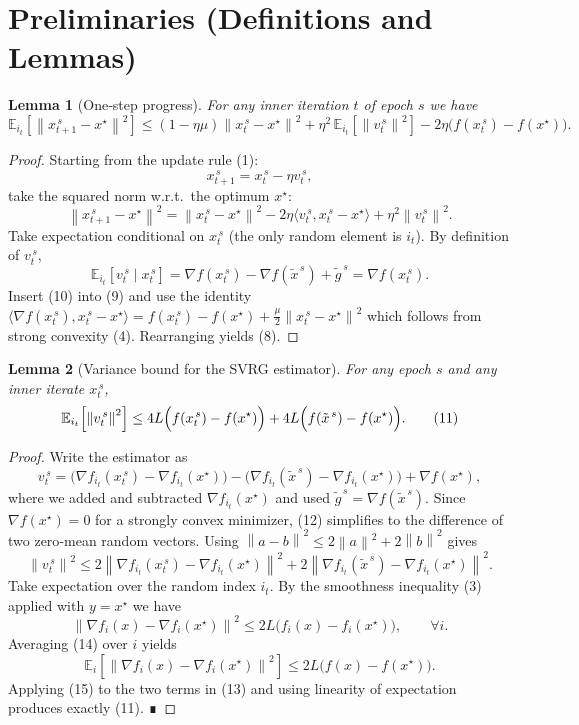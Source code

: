 \documentclass{article}
\newtheorem{lemma}{Lemma}
\newcommand{\E}{\mathbb{E}}
\newcommand{\norm}[1]{\left\|#1\right\|}
\newcommand{\inner}[2]{\langle #1,#2\rangle}
\newcommand{\grad}{\nabla}
\begin{document}
\newpage

\section*{Preliminaries (Definitions and Lemmas)}
\begin{lemma}[One‑step progress]\label{lem:one-step}
For any inner iteration \(t\) of epoch \(s\) we have
\[
\E_{i_t}\!\left[\norm{x_{t+1}^{\,s}-x^{\star}}^{2}\right]
\le\left(1-\eta\mu\right)\norm{x_{t}^{\,s}-x^{\star}}^{2}
+\eta^{2}\,\E_{i_t}\!\left[\norm{v_t^{\,s}}^{2}\right]
-2\eta\bigl(f(x_{t}^{\,s})-f(x^{\star})\bigr).
\tag{8}
\]
\end{lemma}
\begin{proof}
Starting from the update rule (1):
\[
x_{t+1}^{\,s}=x_{t}^{\,s}-\eta v_t^{\,s},
\]
take the squared norm w.r.t.\ the optimum \(x^{\star}\):
\[
\norm{x_{t+1}^{\,s}-x^{\star}}^{2}
= \norm{x_{t}^{\,s}-x^{\star}}^{2}
-2\eta\inner{v_t^{\,s}}{x_{t}^{\,s}-x^{\star}}
+\eta^{2}\norm{v_t^{\,s}}^{2}.
\tag{9}
\]
Take expectation conditional on \(x_{t}^{\,s}\) (the only random element is
\(i_t\)).  By definition of \(v_t^{\,s}\),
\[
\E_{i_t}[v_t^{\,s}\mid x_{t}^{\,s}]
= \grad f(x_{t}^{\,s})-\grad f(\tilde{x}^{\,s})+\tilde{g}^{\,s}
= \grad f(x_{t}^{\,s}).
\tag{10}
\]
Insert (10) into (9) and use the identity
\(\inner{\grad f(x_{t}^{\,s})}{x_{t}^{\,s}-x^{\star}}
= f(x_{t}^{\,s})-f(x^{\star})+\frac{\mu}{2}\norm{x_{t}^{\,s}-x^{\star}}^{2}\)
which follows from strong convexity (4).  Rearranging yields (8).
\end{proof}

\begin{lemma}[Variance bound for the SVRG estimator]\label{lem:variance}
For any epoch \(s\) and any inner iterate \(x_{t}^{\,s}\),
\[
\E_{i_t}\!\left[\norm{v_t^{\,s}}^{2}\right]
\le 4L\Bigl(f(x_{t}^{\,s})-f(x^{\star})\Bigr)
   +4L\Bigl(f(\tilde{x}^{\,s})-f(x^{\star})\Bigr).
\tag{11}
\]
\end{lemma}
\begin{proof}
Write the estimator as
\[
v_t^{\,s}= \bigl(\grad f_{i_t}(x_{t}^{\,s})-\grad f_{i_t}(x^{\star})\bigr)
        -\bigl(\grad f_{i_t}(\tilde{x}^{\,s})-\grad f_{i_t}(x^{\star})\bigr)
        +\grad f(x^{\star}),
\tag{12}
\]
where we added and subtracted \(\grad f_{i_t}(x^{\star})\) and used
\(\tilde{g}^{\,s}= \grad f(\tilde{x}^{\,s})\).  Since \(\grad f(x^{\star})=0\) for a
strongly convex minimizer, (12) simplifies to the difference of two
zero‑mean random vectors.  Using \(\norm{a-b}^{2}\le 2\norm{a}^{2}+2\norm{b}^{2}\) gives
\[
\norm{v_t^{\,s}}^{2}
\le 2\norm{\grad f_{i_t}(x_{t}^{\,s})-\grad f_{i_t}(x^{\star})}^{2}
   +2\norm{\grad f_{i_t}(\tilde{x}^{\,s})-\grad f_{i_t}(x^{\star})}^{2}.
\tag{13}
\]
Take expectation over the random index \(i_t\).  By the smoothness
inequality (3) applied with \(y=x^{\star}\) we have
\[
\norm{\grad f_{i}(x)-\grad f_{i}(x^{\star})}^{2}
\le 2L\bigl(f_i(x)-f_i(x^{\star})\bigr),
\qquad\forall i.
\tag{14}
\]
Averaging (14) over \(i\) yields
\[
\E_{i}\!\left[\norm{\grad f_{i}(x)-\grad f_{i}(x^{\star})}^{2}\right]
\le 2L\bigl(f(x)-f(x^{\star})\bigr).
\tag{15}
\]
Applying (15) to the two terms in (13) and using linearity of expectation
produces exactly (11).  ∎
\end{proof}
\end{document}
